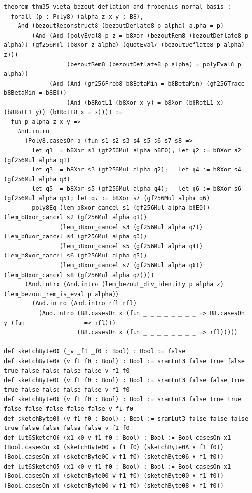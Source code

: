 \documentclass[11pt,letterpaper]{article}
\theoremstyle{spectralthm}
\begin{document}
\begin{lstlisting}[language=Lean4,caption={Standalone Pure Init.Prelude Term-Mode Lean 4 Kernel Suite (thm30--thm61, v0.0.0, 0 sorry, 0 axioms).},label={lst:lean_unified}]
theorem thm35_vieta_bezout_deflation_and_frobenius_normal_basis :
  forall (p : Poly8) (alpha z x y : B8),
    And (bezoutReconstruct8 (bezoutDeflate8 p alpha) alpha = p)
        (And (And (polyEval8 p z = b8Xor (bezoutRem8 (bezoutDeflate8 p alpha)) (gf256Mul (b8Xor z alpha) (quotEval7 (bezoutDeflate8 p alpha) z)))
                  (bezoutRem8 (bezoutDeflate8 p alpha) = polyEval8 p alpha))
             (And (And (gf256Frob8 b8BetaMin = b8BetaMin) (gf256Trace b8BetaMin = b8E0))
                  (And (b8RotL1 (b8Xor x y) = b8Xor (b8RotL1 x) (b8RotL1 y)) (b8RotL8 x = x)))) :=
  fun p alpha z x y =>
    And.intro
      (Poly8.casesOn p (fun s1 s2 s3 s4 s5 s6 s7 s8 =>
        let q1 := b8Xor s1 (gf256Mul alpha b8E0); let q2 := b8Xor s2 (gf256Mul alpha q1)
        let q3 := b8Xor s3 (gf256Mul alpha q2);   let q4 := b8Xor s4 (gf256Mul alpha q3)
        let q5 := b8Xor s5 (gf256Mul alpha q4);   let q6 := b8Xor s6 (gf256Mul alpha q5); let q7 := b8Xor s7 (gf256Mul alpha q6)
        poly8Eq (lem_b8xor_cancel s1 (gf256Mul alpha b8E0)) (lem_b8xor_cancel s2 (gf256Mul alpha q1))
                (lem_b8xor_cancel s3 (gf256Mul alpha q2))   (lem_b8xor_cancel s4 (gf256Mul alpha q3))
                (lem_b8xor_cancel s5 (gf256Mul alpha q4))   (lem_b8xor_cancel s6 (gf256Mul alpha q5))
                (lem_b8xor_cancel s7 (gf256Mul alpha q6))   (lem_b8xor_cancel s8 (gf256Mul alpha q7))))
      (And.intro (And.intro (lem_bezout_div_identity p alpha z) (lem_bezout_rem_is_eval p alpha))
        (And.intro (And.intro rfl rfl)
          (And.intro (B8.casesOn x (fun _ _ _ _ _ _ _ _ => B8.casesOn y (fun _ _ _ _ _ _ _ _ => rfl)))
                     (B8.casesOn x (fun _ _ _ _ _ _ _ _ => rfl)))))

def sketchByte00 (_v _f1 _f0 : Bool) : Bool := false
def sketchByte0A (v f1 f0 : Bool) : Bool := sramLut3 false true false true false false false false v f1 f0
def sketchByte0C (v f1 f0 : Bool) : Bool := sramLut3 false false true true false false false false v f1 f0
def sketchByte06 (v f1 f0 : Bool) : Bool := sramLut3 false true true false false false false false v f1 f0
def sketchByte08 (v f1 f0 : Bool) : Bool := sramLut3 false false false true false false false false v f1 f0
def lut6SketchO6 (x1 x0 v f1 f0 : Bool) : Bool := Bool.casesOn x1 (Bool.casesOn x0 (sketchByte00 v f1 f0) (sketchByte0A v f1 f0)) (Bool.casesOn x0 (sketchByte0C v f1 f0) (sketchByte06 v f1 f0))
def lut6SketchO5 (x1 x0 v f1 f0 : Bool) : Bool := Bool.casesOn x1 (Bool.casesOn x0 (sketchByte00 v f1 f0) (sketchByte00 v f1 f0)) (Bool.casesOn x0 (sketchByte00 v f1 f0) (sketchByte08 v f1 f0))


\end{lstlisting}
\end{document}
